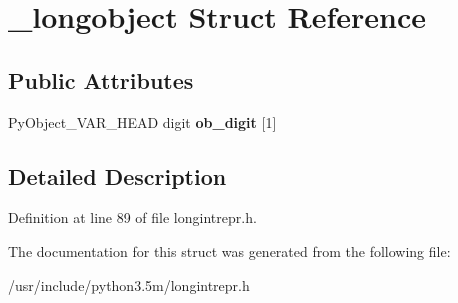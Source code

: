 \hypertarget{struct__longobject}{}\section{\+\_\+longobject Struct Reference}
\label{struct__longobject}
\subsection*{Public Attributes}
\begin{DoxyCompactItemize}
\item 
Py\+Object\+\_\+\+V\+A\+R\+\_\+\+H\+E\+AD digit {\bfseries ob\+\_\+digit} \mbox{[}1\mbox{]}\hypertarget{struct__longobject_a51d41b184bbe2c21854826c1f5ef4a99}{}\label{struct__longobject_a51d41b184bbe2c21854826c1f5ef4a99}

\end{DoxyCompactItemize}


\subsection{Detailed Description}


Definition at line 89 of file longintrepr.\+h.



The documentation for this struct was generated from the following file\+:\begin{DoxyCompactItemize}
\item 
/usr/include/python3.\+5m/longintrepr.\+h\end{DoxyCompactItemize}
